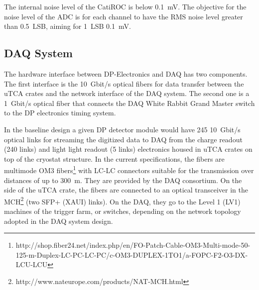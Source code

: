 The internal noise level of the CatiROC is below \SI{0.1}{\milli\volt}. The objective for the noise level of the ADC is for each channel to have the RMS noise level greater than \SI{0.5}{LSB}, aiming for \SI{1}{LSB} \SI{0.1}{\milli\volt}.

\subsection{DAQ System}
\label{sec:fddp-tpc-elec-intfc-daq}

The hardware interface between DP-Electronics and DAQ has two components. The first interface is the \SI{10}{Gbit/s} optical fibers for data transfer between the uTCA crates and the network interface of the DAQ system. The second one is a \SI{1}{Gbit/s} optical fiber that connects the DAQ White Rabbit Grand Master switch to the DP electronics timing system.   

In the baseline design a given DP detector module would have \num{245} \SI{10}{Gbit/s} optical links for streaming the digitized data to DAQ from the charge readout (\num{240} links) and light light readout (\num{5} links) electronics housed in uTCA crates on top of the cryostat structure.  In the current specifications, the fibers are multimode OM3 fibers\footnote{http://shop.fiber24.net/index.php/en/FO-Patch-Cable-OM3-Multi-mode-50-125-m-Duplex-LC-PC-LC-PC/c-OM3-DUPLEX-1TO1/a-FOPC-F2-O3-DX-LCU-LCU} with LC-LC connectors suitable for the transmission over distances of up to \SI{300}{\metre}.  They are provided by the DAQ consortium. On the side of the uTCA crate, the fibers are connected to an optical transceiver in the MCH\footnote{http://www.nateurope.com/products/NAT-MCH.html} (two SFP+ (XAUI) links).  On the DAQ, they go to the Level 1 (LV1) machines of the trigger farm, or switches, depending on the network topology adopted in the DAQ system design.

